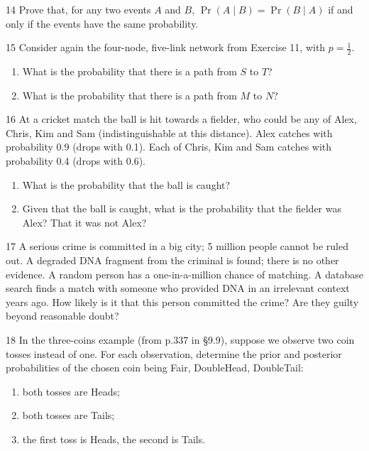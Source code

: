 \begin{exercise}{14}
    Prove that, for any two events $A$ and $B$, $\Pr(A\mid B)=\Pr(B\mid A)$ if and
    only if the events have the same probability.
\end{exercise}

\begin{exercise}{15}
    Consider again the four-node, five-link network from Exercise 11, with
    $p=\frac12$.
    \begin{enumerate}[label=\arabic*.]
        \item What is the probability that there is a path from $S$ to $T$?
        \item What is the probability that there is a path from $M$ to $N$?
    \end{enumerate}
\end{exercise}

\begin{exercise}{16}
    At a cricket match the ball is hit towards a fielder, who could be any of
    Alex, Chris, Kim and Sam (indistinguishable at this distance). Alex catches
    with probability 0.9 (drops with 0.1). Each of Chris, Kim and Sam catches with
    probability 0.4 (drops with 0.6).
    \begin{enumerate}[label=(\alph*)]
        \item What is the probability that the ball is caught?
        \item Given that the ball is caught, what is the probability that the
              fielder was Alex? That it was not Alex?
    \end{enumerate}
\end{exercise}

\begin{exercise}{17}
    A serious crime is committed in a big city; 5 million people cannot be ruled
    out. A degraded DNA fragment from the criminal is found; there is no other
    evidence. A random person has a one-in-a-million chance of matching. A
    database search finds a match with someone who provided DNA in an irrelevant
    context years ago. How likely is it that this person committed the crime? Are
    they guilty beyond reasonable doubt?
\end{exercise}

\begin{exercise}{18}
    In the three-coins example (from p.337 in \S9.9), suppose we observe two
    coin tosses instead of one. For each observation, determine the prior and
    posterior probabilities of the chosen coin being Fair, DoubleHead,
    DoubleTail:
    \begin{enumerate}[label=(\alph*)]
        \item both tosses are Heads;
        \item both tosses are Tails;
        \item the first toss is Heads, the second is Tails.
    \end{enumerate}
\end{exercise}
